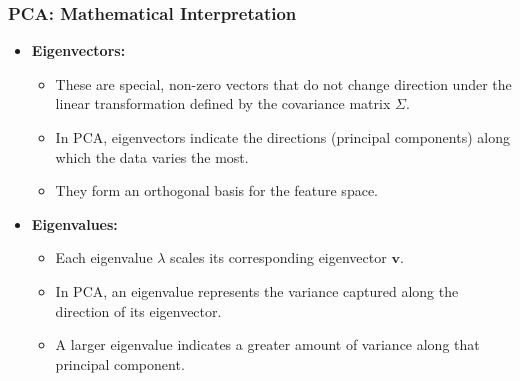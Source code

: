 \documentclass[aspectratio=169]{beamer}
\begin{document}
\begin{frame}
\frametitle{PCA: Mathematical Interpretation}
    \begin{itemize}
        \item \textbf{Eigenvectors:} 
            \begin{itemize}
                \item These are special, non-zero vectors that do not change direction under the linear transformation defined by the covariance matrix \(\Sigma\).
                \item In PCA, eigenvectors indicate the directions (principal components) along which the data varies the most.
                \item They form an orthogonal basis for the feature space.
            \end{itemize}
        \item \textbf{Eigenvalues:}
            \begin{itemize}
                \item Each eigenvalue \(\lambda\) scales its corresponding eigenvector \(\mathbf{v}\).
                \item In PCA, an eigenvalue represents the variance captured along the direction of its eigenvector.
                \item A larger eigenvalue indicates a greater amount of variance along that principal component.
            \end{itemize}
    \end{itemize}
\end{frame}
\end{document}
